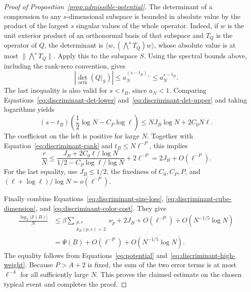 \begin{proof}[Proof of Proposition~\ref{prop:admissible-potential}]
The determinant of a compression to any \(s\)-dimensional
subspace is bounded in absolute value by the product of the
largest \(s\) singular values of the whole operator. Indeed, if
\(w\) is the unit exterior product of an orthonormal basis of
that subspace and \(T_Q\) is the operator of \(Q\), the
determinant is
\(\langle w,(\bigwedge^s T_Q)w\rangle\), whose absolute value
is at most \(\|\bigwedge^s T_Q\|\). Apply this to the subspace
\(S\). Using the spectral bounds above, including the rank-zero
convention, gives
\begin{equation}\label{eq:discriminant-det-upper}
 \left|\det_{\mathrm{orth}}(Q|_S)\right|
 \le a_N^{(s-t_B)_+}\le a_N^{s-t_B}.
\end{equation}
The last inequality is also valid for \(s<t_B\), since \(a_N<1\).
Comparing Equations~\eqref{eq:discriminant-det-lower}
and~\eqref{eq:discriminant-det-upper} and taking logarithms yields
\[
 (s-t_B)\left(\frac12\log N-C_P\log\ell\right)
 \le NJ_B\log N+2C_0N\ell.
\]
The coefficient on the left is positive for large \(N\).
Together with Equation~\eqref{eq:discriminant-rank} and
\(t_B\le N\ell^{-P}\), this implies
\[
 \frac rN
 \le
 \frac{J_B+2C_0\ell/\log N}
      {1/2-C_P\log\ell/\log N}
       +2\ell^{-P}
 =2J_B+O(\ell^{-P}).
\]
For the last equality, use \(J_B\le1/2\), the fixedness of
\(C_0,C_P,P\), and
\((\ell+\log\ell)/\log N=o(\ell^{-P})\).

Finally combine Equations~\eqref{eq:discriminant-size-loss},
\eqref{eq:discriminant-cube-dimension}, and
\eqref{eq:discriminant-color-cost}. They give
\[
 \begin{split}
 \frac{\log_2|\mathcal S(B)|}{N}
 &\le
 \beta\sum_{\substack{p,e\\k_B(p,e)=2}}\nu_p
       +2J_B+O(\ell^{-P})+O(N^{-1/5}\log N)\\
 &=\Psi(B)+O(\ell^{-P})+O(N^{-1/5}\log N).
 \end{split}
\]
The equality follows from Equations~\eqref{eq:potential}
and~\eqref{eq:discriminant-high-weight}. Because \(P>A+2\) is
fixed, the sum of the two error terms is at most \(\ell^{-A}\) for all
sufficiently large \(N\). This proves the claimed estimate on
the chosen typical event and completes the proof.
\end{proof}
